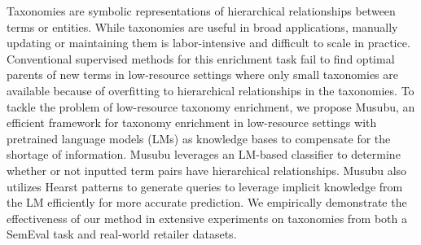 Taxonomies are symbolic representations of hierarchical relationships between terms or entities. While taxonomies are useful in broad applications, manually updating or maintaining them is labor-intensive and difficult to scale in practice. Conventional supervised methods for this enrichment task fail to find optimal parents of new terms in low-resource settings where only small taxonomies are available because of overfitting to hierarchical relationships in the taxonomies. To tackle the problem of low-resource taxonomy enrichment, we propose Musubu, an efficient framework for taxonomy enrichment in low-resource settings with pretrained language models (LMs) as knowledge bases to compensate for the shortage of information. Musubu leverages an LM-based classifier to determine whether or not inputted term pairs have hierarchical relationships. Musubu also utilizes Hearst patterns to generate queries to leverage implicit knowledge from the LM efficiently for more accurate prediction. We empirically demonstrate the effectiveness of our method in extensive experiments on taxonomies from both a SemEval task and real-world retailer datasets.
